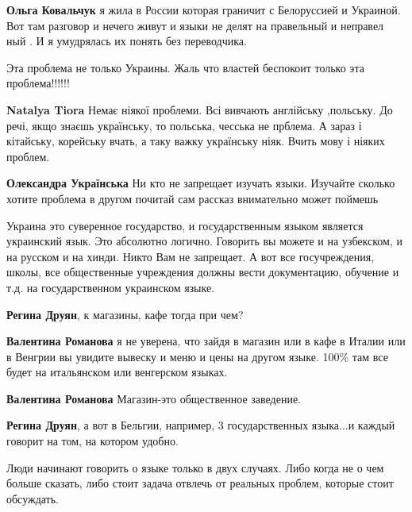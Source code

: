 \begin{itemize}
\begin{itemize}

\textbf{Ольга Ковальчук} я жила в России которая граничит с Белоруссией и Украиной. Вот
там разговор и нечего живут и языки не делят на правельный и неправел ный . И я
умудрялась их понять без переводчика.

\end{itemize}


Эта проблема не только Украины. Жаль что властей беспокоит только эта проблема!!!!!!

\begin{itemize}
\textbf{Natalya Tiora} Немає ніякої проблеми. Всі вивчають англійську
,польську. До речі, якщо знаєшь українську, то польська, чесська не прблема. А
зараз і кітайську, корейську вчать, а таку важку українську ніяк. Вчить мову і
ніяких проблем.

\textbf{Олександра Українська} 
Ни кто не запрещает изучать языки. Изучайте сколько хотите
проблема в другом почитай сам рассказ внимательно может поймешь
\end{itemize}


Украина это суверенное государство, и государственным языком является
украинский язык. Это абсолютно логично. Говорить вы можете и на узбекском, и на
русском и на хинди. Никто Вам не запрещает. А вот все госучреждения, школы, все
общественные учреждения должны вести документацию, обучение и т.д. на
государственном украинском языке.

\begin{itemize}
\textbf{Регина Друян}, к магазины, кафе тогда при чем?


\textbf{Валентина Романова} я не уверена, что зайдя в магазин или в кафе в
Италии или в Венгрии вы увидите вывеску и меню и цены на другом языке. 100\% там
все будет на итальянском или венгерском языках.

\textbf{Валентина Романова} Магазин-это общественное заведение.

\textbf{Регина Друян}, а вот в Бельгии, например, 3 государственных языка...и каждый говорит на том, на котором удобно.
\end{itemize}


Люди начинают говорить о языке только в двух случаях. Либо когда не о чем
больше сказать, либо стоит задача отвлечь от реальных проблем, которые стоит
обсуждать.


\end{itemize}
